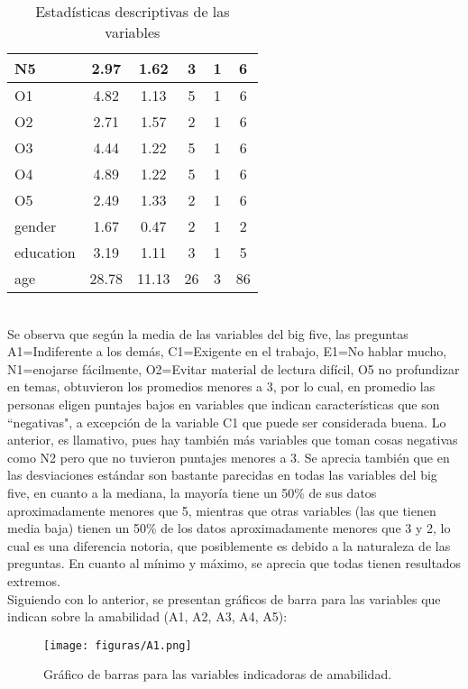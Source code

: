 \documentclass{report}
\begin{document}
\begin{table}[h!]
\begin{center}
\begin{tabular}{|l|c|c|c|c|c|}
N5    &2.97 & 1.62     & 3  & 1  & 6\\
\hline
O1    &4.82 & 1.13     & 5  & 1  & 6\\
\hline
O2  &2.71 & 1.57     & 2  & 1  & 6\\
\hline
O3   &4.44 & 1.22     & 5  & 1  & 6\\
\hline
O4   &4.89 & 1.22     & 5  & 1  & 6\\
\hline
O5    &2.49 & 1.33     & 2  & 1  & 6\\
\hline
gender  &1.67 & 0.47     & 2  & 1  & 2\\
\hline
education  &3.19 & 1.11     & 3  & 1  & 5\\
\hline
age    & 28.78 &11.13 &     26 &3  &86\\
\hline
    \end{tabular}
  \end{center}
  \caption{Estadísticas descriptivas de las variables}
\end{table}\\
Se observa que según la media de las variables del big five, las preguntas A1=Indiferente a los demás, C1=Exigente en el trabajo, E1=No hablar mucho, N1=enojarse fácilmente, O2=Evitar material de lectura difícil, O5 no profundizar en temas, obtuvieron los promedios menores a 3, por lo cual, en promedio las personas eligen puntajes bajos en variables que indican características que son ``negativas", a excepción de la variable C1 que puede ser considerada buena. Lo anterior, es llamativo, pues hay también más variables que toman cosas negativas como N2 pero que no tuvieron puntajes menores a 3. Se aprecia también que en las desviaciones estándar son bastante parecidas en todas las variables del big five, en cuanto a la mediana, la mayoría tiene un 50\% de sus datos aproximadamente menores que 5, mientras que otras variables (las que tienen media baja) tienen un 50\% de los datos aproximadamente menores que 3 y 2, lo cual es una diferencia notoria, que posiblemente es debido a la naturaleza de las preguntas. En cuanto al mínimo y máximo, se aprecia que todas tienen resultados extremos.\\

Siguiendo con lo anterior, se presentan gráficos de barra para las variables que indican sobre la amabilidad (A1, A2, A3, A4, A5):\\

\begin{figure}[htp]
        \centering
    	\texttt{[image: figuras/A1.png]}
    	\caption{Gráfico de barras para las variables indicadoras de amabilidad.}
    	\label{fig: Figura1}
\end{figure}\\
\end{document}
